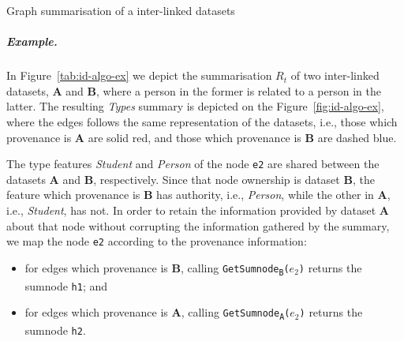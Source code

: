 \begin{algorithm}
	\DontPrintSemicolon
	\BlankLine
	\caption{Graph summarisation of a inter-linked datasets}
	\label{alg:id-summary}
\end{algorithm}

\subparagraph{Example.}

In Figure~\ref{tab:id-algo-ex} we depict the summarisation $R_t$ of two inter-linked datasets, \textbf{A} and \textbf{B}, where a person in the former is related to a person in the latter. The resulting \emph{Types} summary is depicted on the Figure~\ref{fig:id-algo-ex}, where the edges follows the same representation of the datasets, i.e., those which provenance is \textbf{A} are solid red, and those which provenance is \textbf{B} are dashed blue.

The type features \emph{Student} and \emph{Person} of the node \texttt{e2} are shared between the datasets \textbf{A} and \textbf{B}, respectively. Since that node ownership is dataset \textbf{B}, the feature which provenance is \textbf{B} has authority, i.e., \emph{Person}, while the other in \textbf{A}, i.e., \emph{Student}, has not. In order to retain the information provided by dataset \textbf{A} about that node without corrupting the information gathered by the summary, we map the node \texttt{e2} according to the provenance information:
\begin{itemize}
\item for edges which provenance is \textbf{B}, calling \texttt{GetSumnode\textsubscript{B}($e_2$)} returns the sumnode \texttt{h1}; and
\item for edges which provenance is \textbf{A}, calling \texttt{GetSumnode\textsubscript{A}($e_2$)} returns the sumnode \texttt{h2}.
\end{itemize}

